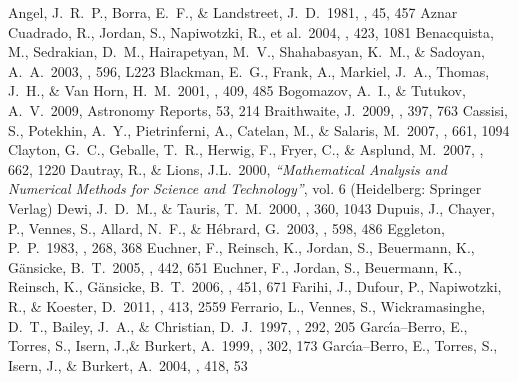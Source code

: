 \documentclass[]{emulateapj}
\begin{document}

\begin{thebibliography}{} 
 Angel, J.~R.~P., Borra, E.~F., \& Landstreet, J.~D.\ 1981, \apjs, 45, 457
 Aznar Cuadrado, R., Jordan, S., Napiwotzki, R., et al.\ 2004, \aap, 423, 1081 
 Benacquista, M., Sedrakian, D.~M., Hairapetyan, M.~V., Shahabasyan, K.~M., \& Sadoyan, A.~A.\ 2003, \apjl, 596, L223
 Blackman, E.~G., Frank, A., Markiel, J.~A., Thomas, J.~H., \& Van Horn, H.~M.\ 2001, \nat, 409, 485
 Bogomazov, A.~I., \& Tutukov, A.~V.\ 2009, Astronomy Reports, 53, 214 
 Braithwaite, J.\ 2009, \mnras, 397, 763
 Cassisi, S., Potekhin, A.~Y., Pietrinferni, A., Catelan, M., \& Salaris, M.\ 2007, \apj, 661, 1094
 Clayton, G.~C., Geballe, T.~R., Herwig, F., Fryer, C., \& Asplund, M.\ 2007, \apj, 662, 1220
 Dautray, R., \& Lions, J.L.\ 2000, {\sl ``Mathematical Analysis and Numerical Methods for Science and Technology''}, vol. 6 (Heidelberg: Springer Verlag)
 Dewi, J.~D.~M., \& Tauris, T.~M.\ 2000, \aap, 360, 1043
 Dupuis, J., Chayer, P., Vennes, S., Allard, N.~F., \& H{\'e}brard, G.\ 2003, \apj, 598, 486
 Eggleton, P.~P.\ 1983, \apj, 268, 368
 Euchner, F., Reinsch, K., Jordan, S., Beuermann, K., G\"ansicke, B.~T.\ 2005, \aap, 442, 651 
 Euchner, F., Jordan, S., Beuermann, K., Reinsch, K., G\"ansicke, B.~T.\ 2006, \aap, 451, 671 
 Farihi, J., Dufour, P., Napiwotzki, R., \& Koester, D.\ 2011, \mnras, 413, 2559
 Ferrario, L., Vennes, S., Wickramasinghe, D.~T., Bailey, J.~A., \& Christian, D.~J.\ 1997, \mnras, 292, 205
 Garc{\'{\i}}a--Berro, E., Torres, S., Isern, J.,\& Burkert, A.\ 1999, \mnras, 302, 173
 Garc{\'{\i}}a--Berro, E., Torres, S., Isern, J., \& Burkert, A.\ 2004, \aap, 418, 53

\end{thebibliography}
\end{document}
